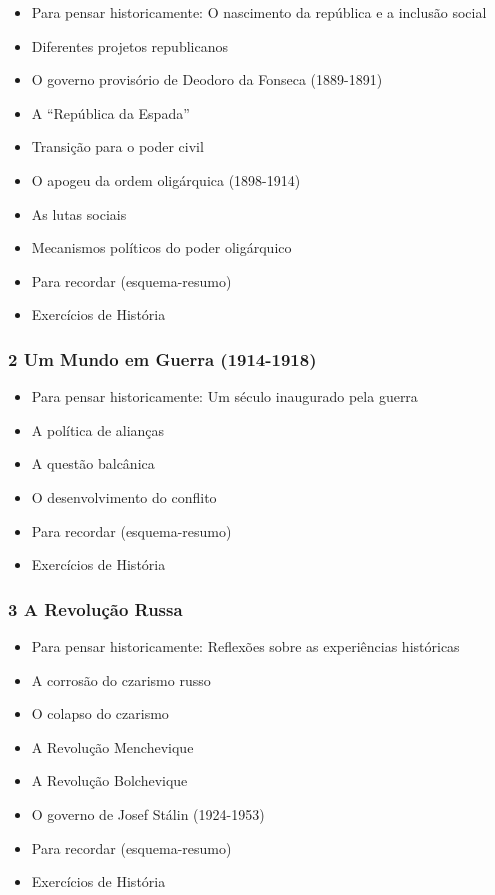 \documentclass[a4paper,12pt]{article}[abntex2]
\begin{document}
\begin{itemize}
\item Para pensar historicamente: O nascimento da república e a inclusão social
\item Diferentes projetos republicanos
\item O governo provisório de Deodoro da Fonseca (1889-1891)
\item A “República da Espada”
\item Transição para o poder civil
\item O apogeu da ordem oligárquica (1898-1914)
\item As lutas sociais
\item Mecanismos políticos do poder oligárquico
\item Para recordar (esquema-resumo)
\item Exercícios de História
\end{itemize}
\subsubsection*{2 Um Mundo em Guerra (1914-1918)}

\begin{itemize}
\item Para pensar historicamente: Um século inaugurado pela guerra
\item A política de alianças
\item A questão balcânica
\item O desenvolvimento do conflito
\item Para recordar (esquema-resumo)
\item Exercícios de História
\end{itemize}
\subsubsection*{3 A Revolução Russa}

\begin{itemize}
\item Para pensar historicamente: Reflexões sobre as experiências históricas
\item A corrosão do czarismo russo
\item O colapso do czarismo
\item A Revolução Menchevique
\item A Revolução Bolchevique
\item O governo de Josef Stálin (1924-1953)
\item Para recordar (esquema-resumo)
\item Exercícios de História
\end{itemize}
\end{document}
